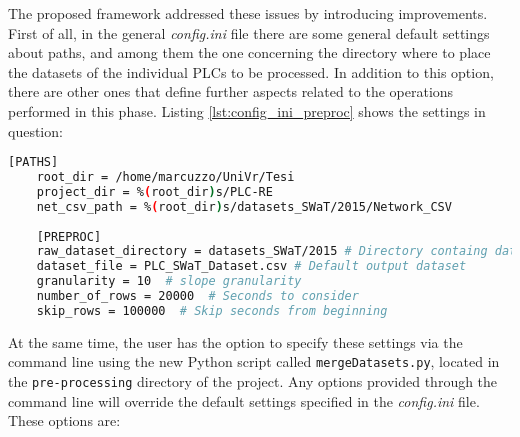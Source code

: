 \bigskip
The proposed framework addressed these issues by introducing improvements. First of all, in the general \textit{config.ini} file there are some general default settings about paths, and among them the one concerning the directory where to place the datasets of the individual PLCs to be processed. In addition to this option, there are other ones that define further aspects related to the operations performed in this phase. Listing \ref{lst:config_ini_preproc} shows the settings in question: 

\begin{lstlisting}[language=bash, numbers=none, caption=Paths and parameters for the Pre-processing phase in \textit{config.ini} file, label=lst:config_ini_preproc]	
	[PATHS]
	root_dir = /home/marcuzzo/UniVr/Tesi
	project_dir = %(root_dir)s/PLC-RE
	net_csv_path = %(root_dir)s/datasets_SWaT/2015/Network_CSV
	
	[PREPROC]
	raw_dataset_directory = datasets_SWaT/2015 # Directory containg datasets
	dataset_file = PLC_SWaT_Dataset.csv # Default output dataset
	granularity = 10  # slope granularity
	number_of_rows = 20000  # Seconds to consider
	skip_rows = 100000  # Skip seconds from beginning
\end{lstlisting}
At the same time, the user has the option to specify these settings via the command line using the new Python script called \texttt{mergeDatasets.py}, located in the \texttt{pre-processing} directory of the project. Any options provided through the command line will override the default settings specified in the \textit{config.ini} file. These options are:

